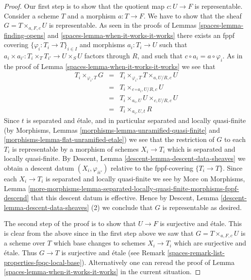 \begin{proof}
\medskip\noindent
Our first step is to show that the quotient map
$c : U \to F$ is representable.
Consider a scheme $T$ and a morphism $a : T \to F$.
We have to show that the sheaf $G = T \times_{a, F, c} U$
is representable.
As seen in the proofs of Lemmas \ref{spaces-lemma-finding-opens} and
\ref{spaces-lemma-when-it-works-it-works} there exists an fppf covering
$\{\varphi_i : T_i \to T\}_{i \in I}$ and morphisms $a_i : T_i \to U$
such that $a_i \times a_{i'} : T_i \times_T T_{i'} \to U \times_S U$
factors through $R$, and such that $c \circ a_i = a \circ \varphi_i$.
As in the proof of Lemma \ref{spaces-lemma-when-it-works-it-works} we see that
\begin{eqnarray*}
T_i \times_{\varphi_i, T} G & = &
T_i \times_{\varphi_i, T} T \times_{a, U/R, c} U \\
& = & T_i \times_{c \circ a_i, U/R, c} U \\
& = & T_i \times_{a_i, U} U \times_{c, U/R, c} U \\
& = & T_i \times_{a_i, U, t} R
\end{eqnarray*}
Since $t$ is separated and \'etale, and in particular
separated and locally quasi-finite (by Morphisms, Lemmas
\ref{morphisms-lemma-unramified-quasi-finite} and
\ref{morphisms-lemma-flat-unramified-etale})
we see that the restriction
of $G$ to each $T_i$ is representable by a morphism of schemes
$X_i \to T_i$ which is separated and locally quasi-finite. By
Descent, Lemma \ref{descent-lemma-descent-data-sheaves}
we obtain a descent datum $(X_i, \varphi_{ii'})$ relative
to the fppf-covering $\{T_i \to T\}$. Since each
$X_i \to T_i$ is separated and locally quasi-finite we see by
More on Morphisms, Lemma
\ref{more-morphisms-lemma-separated-locally-quasi-finite-morphisms-fppf-descend}
that this descent datum is effective.
Hence by
Descent, Lemma \ref{descent-lemma-descent-data-sheaves} (2)
we conclude that $G$ is representable as desired.

\medskip\noindent
The second step of the proof is to show that $U \to F$ is surjective and
\'etale. This is clear from the above since in the first step above we
saw that $G = T \times_{a, F, c} U$ is a scheme over $T$ which base changes
to schemes $X_i \to T_i$ which are surjective and \'etale. Thus $G \to T$
is surjective and \'etale (see
Remark \ref{spaces-remark-list-properties-fpqc-local-base}).
Alternatively one can reread the proof of
Lemma \ref{spaces-lemma-when-it-works-it-works} in the current
situation.


\end{proof}

